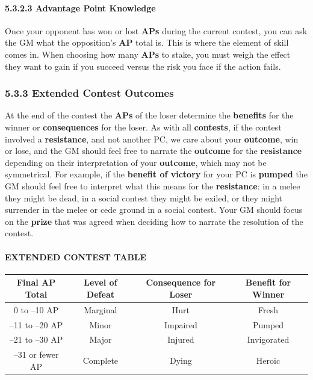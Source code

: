 \documentclass[
]{article}
\begin{document}
\hypertarget{advantage-point-knowledge}{%
\paragraph{5.3.2.3 Advantage Point
Knowledge}\label{advantage-point-knowledge}}

Once your opponent has won or lost \textbf{APs} during the current
contest, you can ask the GM what the opposition's \textbf{AP} total is.
This is where the element of skill comes in. When choosing how many
\textbf{APs} to stake, you must weigh the effect they want to gain if
you succeed versus the risk you face if the action fails.

\hypertarget{extended-contest-outcomes}{%
\subsubsection{5.3.3 Extended Contest
Outcomes}\label{extended-contest-outcomes}}

At the end of the contest the \textbf{APs} of the loser determine the
\textbf{benefits} for the winner or \textbf{consequences} for the loser.
As with all \textbf{contests}, if the contest involved a
\textbf{resistance}, and not another PC, we care about your
\textbf{outcome}, win or lose, and the GM should feel free to narrate
the \textbf{outcome} for the \textbf{resistance} depending on their
interpretation of your \textbf{outcome}, which may not be symmetrical.
For example, if the \textbf{benefit of victory} for your PC is
\textbf{pumped} the GM should feel free to interpret what this means for
the \textbf{resistance}: in a melee they might be dead, in a social
contest they might be exiled, or they might surrender in the melee or
cede ground in a social contest. Your GM should focus on the
\textbf{prize} that was agreed when deciding how to narrate the
resolution of the contest.

\hypertarget{extended-contest-table-1}{%
\paragraph{EXTENDED CONTEST TABLE}\label{extended-contest-table-1}}

\begin{longtable}[]{@{}cccc@{}}
\toprule
Final AP Total & Level of Defeat & Consequence for Loser & Benefit for
Winner\tabularnewline
\midrule
\endhead
0 to --10 AP & Marginal & Hurt & Fresh\tabularnewline
--11 to --20 AP & Minor & Impaired & Pumped\tabularnewline
--21 to --30 AP & Major & Injured & Invigorated\tabularnewline
--31 or fewer AP & Complete & Dying & Heroic\tabularnewline
\bottomrule
\end{longtable}
\end{document}
